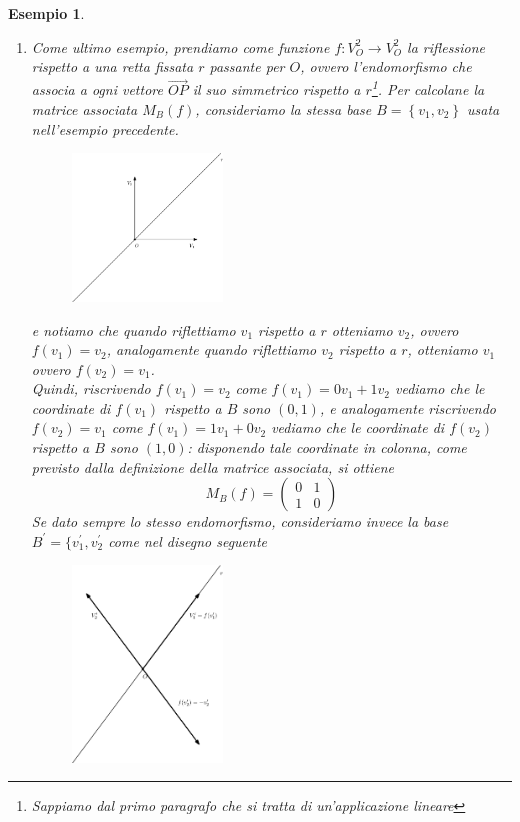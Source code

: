 \documentclass{book}
\newtheorem{esempio}{Esempio}
\begin{document}
\begin{esempio}
\begin{enumerate}
\begin{figure}[th]
    \end{figure}   
  \item Come ultimo esempio, prendiamo come funzione $f:V_O^2\to V_O^2$ la riflessione rispetto a una retta
    fissata $r$ passante per $O$, ovvero l'endomorfismo che associa a ogni vettore $\vec{OP}$ il suo simmetrico
    rispetto a $r$\footnote{Sappiamo dal primo paragrafo che si tratta di un'applicazione lineare}. Per calcolane
    la matrice associata $M_B(f)$, consideriamo la stessa base $B=\left\{v_1,v_2\right\}$ usata nell'esempio
    precedente.
    \clearpage
    \begin{figure}[th]
      \centering
        \includegraphics[width=4cm]{img/finiti/imgex4-3-8.eps}
    \end{figure}
    e notiamo che quando riflettiamo $v_1$ rispetto a $r$ otteniamo $v_2$, ovvero $f(v_1)=v_2$, analogamente
    quando riflettiamo $v_2$ rispetto a $r$, otteniamo $v_1$ ovvero $f(v_2)=v_1$.\\
    Quindi, riscrivendo $f(v_1)=v_2$ come $f(v_1)=0v_1+1v_2$ vediamo che le coordinate di $f(v_1)$ rispetto a $B$
    sono $(0,1)$, e analogamente riscrivendo $f(v_2)=v_1$ come $f(v_1)=1v_1+0v_2$ vediamo che le
    coordinate di $f(v_2)$ rispetto a $B$ sono $(1,0)$: disponendo tale coordinate in colonna,
    come previsto dalla definizione della matrice associata, si ottiene
    \begin{equation*}
      M_B(f)=
      \begin{pmatrix}
        0 & 1\\
        1 & 0
      \end{pmatrix}
    \end{equation*}
    Se dato sempre lo stesso endomorfismo, consideriamo invece la base $B^\prime= \{v_1^\prime,
    v^\prime_2$ come nel disegno seguente
    \begin{figure}[th]
      \centering
        \includegraphics[width=4cm]{img/finiti/imgex4-3-9.eps}

\end{figure}
\end{enumerate}
\end{esempio}
\end{document}
